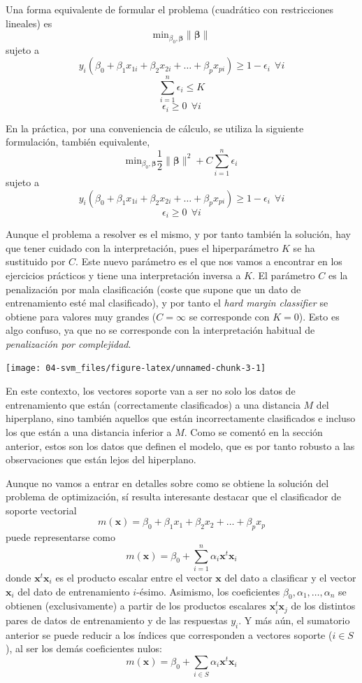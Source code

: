 \documentclass[
  spanish,
]{book}
\theoremstyle{break}
\theoremstyle{definition}
\theoremstyle{definition}
\theoremstyle{definition}
\theoremstyle{definition}
\theoremstyle{remark}
\begin{document}
Una forma equivalente de formular el problema (cuadrático con restricciones lineales) es
\[\mbox{min}_{\beta_0, \boldsymbol{\beta}} \lVert \boldsymbol{\beta} \rVert\]
sujeto a
\[ y_i(\beta_0 + \beta_1 x_{1i} + \beta_2 x_{2i} + \ldots + \beta_p x_{pi}) \ge 1 - \epsilon_i \ \ \forall i\]
\[\sum_{i=1}^n \epsilon_i \le K\]
\[\epsilon_i \ge 0 \ \ \forall i\]

En la práctica, por una conveniencia de cálculo, se utiliza la siguiente formulación, también equivalente,
\[\mbox{min}_{\beta_0, \boldsymbol{\beta}} \frac{1}{2}\lVert \boldsymbol{\beta} \rVert^2 + C \sum_{i=1}^n \epsilon_i\]
sujeto a
\[ y_i(\beta_0 + \beta_1 x_{1i} + \beta_2 x_{2i} + \ldots + \beta_p x_{pi}) \ge 1 - \epsilon_i \ \ \forall i\]
\[\epsilon_i \ge 0 \ \ \forall i\]

Aunque el problema a resolver es el mismo, y por tanto también la solución, hay que tener cuidado con la interpretación, pues el hiperparámetro \(K\) se ha sustituido por \(C\). Este nuevo parámetro es el que nos vamos a encontrar en los ejercicios prácticos y tiene una interpretación inversa a \(K\). El parámetro \(C\) es la penalización por mala clasificación (coste que supone que un dato de entrenamiento esté mal clasificado), y por tanto el \emph{hard margin classifier} se obtiene para valores muy grandes (\(C = \infty\) se corresponde con \(K = 0\)). Esto es algo confuso, ya que no se corresponde con la interpretación habitual de \emph{penalización por complejidad}.

\begin{center}\texttt{[image: 04-svm\_files/figure-latex/unnamed-chunk-3-1]} \end{center}

En este contexto, los vectores soporte van a ser no solo los datos de entrenamiento que están (correctamente clasificados) a una distancia \(M\) del hiperplano, sino también aquellos que están incorrectamente clasificados e incluso los que están a una distancia inferior a \(M\). Como se comentó en la sección anterior, estos son los datos que definen el modelo, que es por tanto robusto a las observaciones que están lejos del hiperplano.

Aunque no vamos a entrar en detalles sobre como se obtiene la solución del problema de optimización, sí resulta interesante destacar que el clasificador de soporte vectorial
\[m(\mathbf{x}) = \beta_0 + \beta_1 x_1 + \beta_2 x_2 + \ldots + \beta_p x_p\]
puede representarse como
\[m(\mathbf{x}) = \beta_0 + \sum_{i=1}^n \alpha_i \mathbf{x}^t \mathbf{x}_i\]
donde \(\mathbf{x}^t \mathbf{x}_i\) es el producto escalar entre el vector \(\mathbf{x}\) del dato a clasificar y el vector \(\mathbf{x}_i\) del dato de entrenamiento \(i\)-ésimo. Asimismo, los coeficientes \(\beta_0, \alpha_1, \ldots, \alpha_n\) se obtienen (exclusivamente) a partir de los productos escalares \(\mathbf{x}_i^t \mathbf{x}_j\) de los distintos pares de datos de entrenamiento y de las respuestas \(y_i\). Y más aún, el sumatorio anterior se puede reducir a los índices que corresponden a vectores soporte (\(i\in S\)), al ser los demás coeficientes nulos:
\[m(\mathbf{x}) = \beta_0 + \sum_{i\in S} \alpha_i \mathbf{x}^t \mathbf{x}_i\]
\end{document}
